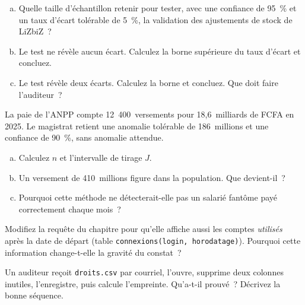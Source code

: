 \begin{boxexo}[title={\ding{45}\quad Exercice~10.5. Dimensionner et conclure \niveaumoyen}]
\begin{enumerate}[(a)]
    \item Quelle taille d'échantillon retenir pour tester, avec une confiance
          de 95~\% et un taux d'écart tolérable de 5~\%, la validation des
          ajustements de stock de LiZbiZ~?
    \item Le test ne révèle aucun écart. Calculez la borne supérieure du
          taux d'écart et concluez.
    \item Le test révèle deux écarts. Calculez la borne et concluez. Que
          doit faire l'auditeur~?
\end{enumerate}
\end{boxexo}

\begin{boxexo}[title={\ding{45}\quad Exercice~10.6. Échantillonnage monétaire \niveaumoyen}]
La paie de l'ANPP compte 12~400~versements pour 18,6~milliards de FCFA en
2025. Le magistrat retient une anomalie tolérable de 186~millions et une
confiance de 90~\%, sans anomalie attendue.
\begin{enumerate}[(a)]
    \item Calculez $n$ et l'intervalle de tirage $J$.
    \item Un versement de 410~millions figure dans la population. Que
          devient-il~?
    \item Pourquoi cette méthode ne détecterait-elle pas un salarié fantôme
          payé correctement chaque mois~?
\end{enumerate}
\end{boxexo}

\begin{boxexo}[title={\ding{45}\quad Exercice~10.7. La requête de D.2.1 \niveaumoyen}]
Modifiez la requête du chapitre pour qu'elle affiche aussi les comptes
\emph{utilisés} après la date de départ (table
\texttt{connexions(login, horodatage)}). Pourquoi cette information
change-t-elle la gravité du constat~?
\end{boxexo}

\begin{boxexo}[title={\ding{45}\quad Exercice~10.8. L'empreinte \niveaubase}]
Un auditeur reçoit \texttt{droits.csv} par courriel, l'ouvre, supprime deux
colonnes inutiles, l'enregistre, puis calcule l'empreinte. Qu'a-t-il
prouvé~? Décrivez la bonne séquence.
\end{boxexo}

